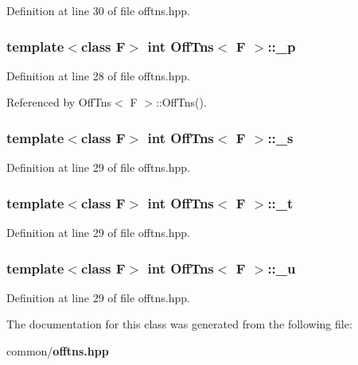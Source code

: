 Definition at line 30 of file offtns.hpp.
\subsubsection{\setlength{\rightskip}{0pt plus 5cm}template$<$class F$>$ int {\bf Off\-Tns}$<$ F $>$::{\bf \_\-p}}\label{classOffTns_3b294e0c5d0f27989f6d4c274ecccab0_3b294e0c5d0f27989f6d4c274ecccab0}




Definition at line 28 of file offtns.hpp.

Referenced by Off\-Tns$<$ F $>$::Off\-Tns().
\subsubsection{\setlength{\rightskip}{0pt plus 5cm}template$<$class F$>$ int {\bf Off\-Tns}$<$ F $>$::{\bf \_\-s}}\label{classOffTns_c195aeabeeee007891190b9ff8a32c70_c195aeabeeee007891190b9ff8a32c70}




Definition at line 29 of file offtns.hpp.
\subsubsection{\setlength{\rightskip}{0pt plus 5cm}template$<$class F$>$ int {\bf Off\-Tns}$<$ F $>$::{\bf \_\-t}}\label{classOffTns_05cb7dc333ca611d0a8969704e39a9f0_05cb7dc333ca611d0a8969704e39a9f0}




Definition at line 29 of file offtns.hpp.
\subsubsection{\setlength{\rightskip}{0pt plus 5cm}template$<$class F$>$ int {\bf Off\-Tns}$<$ F $>$::{\bf \_\-u}}\label{classOffTns_3b5e2fd0bdc8d3094bd676aa0744a726_3b5e2fd0bdc8d3094bd676aa0744a726}




Definition at line 29 of file offtns.hpp.

The documentation for this class was generated from the following file:\begin{CompactItemize}
\item 
common/{\bf offtns.hpp}\end{CompactItemize}
